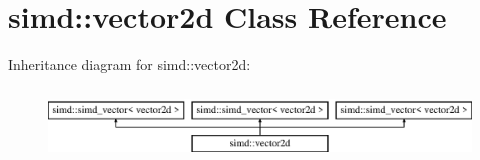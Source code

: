 \hypertarget{classsimd_1_1vector2d}{\section{simd\+:\+:vector2d Class Reference}
\label{classsimd_1_1vector2d}
}
Inheritance diagram for simd\+:\+:vector2d\+:\begin{figure}[H]
\begin{center}
\leavevmode
\includegraphics[height=1.934370cm]{classsimd_1_1vector2d}
\end{center}
\end{figure}
